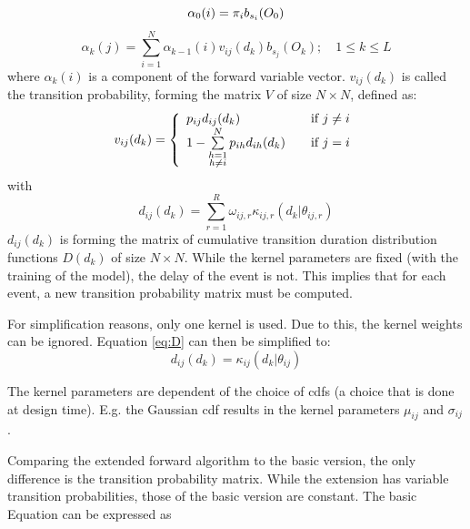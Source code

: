 \documentclass[mscthesis]{usiinfthesis}
\begin{document}
\begin{equation}
    \label{eq:forward_init}
    \alpha_0(i) = \pi_{i}b_{s_i}(O_0) \\
\end{equation}
\begin{equation}
    \label{eq:forward}
    \alpha_k(j) = \sum_{i=1}^{N} \alpha_{k-1}(i) v_{ij}(d_k) b_{s_j}(O_k);
    \quad 1 \leq k \leq L
\end{equation}
where $\alpha_k(i)$ is a component of the forward variable vector.
$v_{ij}(d_k)$ is called the transition probability, forming the matrix $V$ of
size $N \times N$, defined as:
\begin{equation}
    \label{eq:V}
    v_{ij}(d_k) = \left\{
        \begin{array}{l l}
            p_{ij} d_{ij}(d_k)
                & \quad \text{if $j \neq i$}\\
            1 - \sum\limits_{\substack{h=1 \\ h \neq i}}^{N} p_{ih} d_{ih}(d_k)
                & \quad \text{if $j = i$}
        \end{array} \right.
\end{equation}
with
\begin{equation}
    \label{eq:D}
    d_{ij}(d_k) = \sum_{r=1}^{R} \omega_{ij,r}\kappa_{ij,r}(d_k|\theta_{ij, r})
\end{equation}
$d_{ij}(d_k)$ is forming the matrix of cumulative transition duration
distribution functions $D(d_k)$ of size $ N\times N$. While the kernel
parameters are fixed (with the training of the model), the delay of the event
is not. This implies that for each event, a new transition probability matrix
must be computed.

For simplification reasons, only one kernel is used. Due to this, the kernel
weights can be ignored. Equation \ref{eq:D} can then be simplified to:
\begin{equation}
    \label{eq:D_fact}
    d_{ij}(d_k) = \kappa_{ij}(d_k | \theta_{ij})
\end{equation}

The kernel parameters are dependent of the choice of \glspl{cdf} (a choice that
is done at design time). E.g. the Gaussian \gls{cdf} results in the kernel
parameters $\mu_{ij}$ and $\sigma_{ij}$.

Comparing the extended forward algorithm to the basic version, the only
difference is the transition probability matrix. While the extension has
variable transition probabilities, those of the basic version are constant. The
basic Equation can be expressed as
\end{document}
